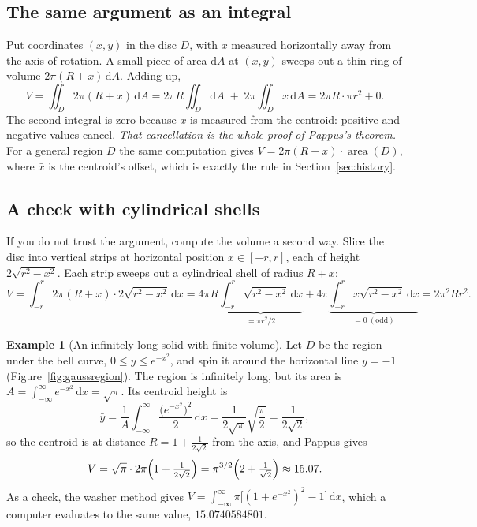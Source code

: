 \documentclass[11pt]{article}
\theoremstyle{plain}
\theoremstyle{definition}
\newtheorem{example}[lemma]{Example}
\theoremstyle{remark}
\newcommand{\dd}{\,\mathrm{d}}
\begin{document}
\subsection{The same argument as an integral}
Put coordinates $(x,y)$ in the disc $D$, with $x$ measured horizontally away from the axis of rotation. A small piece of area $\mathrm dA$ at $(x,y)$ sweeps out a thin ring of volume $2\pi(R+x)\,\mathrm dA$. Adding up,
\[
  V = \iint_D 2\pi(R+x)\dd A
    = 2\pi R\iint_D \mathrm dA \;+\; 2\pi\iint_D x\dd A
    = 2\pi R\cdot \pi r^2 + 0 .
\]
The second integral is zero because $x$ is measured from the centroid: positive and negative values cancel. \emph{That cancellation is the whole proof of Pappus's theorem.} For a general region $D$ the same computation gives $V=2\pi(R+\bar x)\cdot\operatorname{area}(D)$, where $\bar x$ is the centroid's offset, which is exactly the rule in Section~\ref{sec:history}.

\subsection{A check with cylindrical shells}
If you do not trust the argument, compute the volume a second way. Slice the disc into vertical strips at horizontal position $x\in[-r,r]$, each of height $2\sqrt{r^2-x^2}$. Each strip sweeps out a cylindrical shell of radius $R+x$:
\[
  V=\int_{-r}^{r}2\pi(R+x)\cdot 2\sqrt{r^2-x^2}\dd x
   = 4\pi R\underbrace{\int_{-r}^{r}\sqrt{r^2-x^2}\dd x}_{=\pi r^2/2}
   + 4\pi\underbrace{\int_{-r}^{r}x\sqrt{r^2-x^2}\dd x}_{=0\ (\text{odd})}
   = 2\pi^2Rr^2 .
\]

\begin{example}[An infinitely long solid with finite volume]\label{ex:gauss}
Let $D$ be the region under the bell curve, $0\le y\le e^{-x^2}$, and spin it around the horizontal line $y=-1$ (Figure~\ref{fig:gaussregion}). The region is infinitely long, but its area is $A=\int_{-\infty}^{\infty}e^{-x^2}\dd x=\sqrt\pi$. Its centroid height is
\[
  \bar y=\frac1A\int_{-\infty}^{\infty}\frac{\bigl(e^{-x^2}\bigr)^2}{2}\dd x=\frac{1}{2\sqrt\pi}\sqrt{\frac\pi2}=\frac{1}{2\sqrt2},
\]
so the centroid is at distance $R=1+\frac1{2\sqrt2}$ from the axis, and Pappus gives
\[
  V=\sqrt\pi\cdot 2\pi\Bigl(1+\tfrac1{2\sqrt2}\Bigr)=\pi^{3/2}\Bigl(2+\tfrac1{\sqrt2}\Bigr)\approx 15.07 .
\]
As a check, the washer method gives $V=\int_{-\infty}^{\infty}\pi\bigl[(1+e^{-x^2})^2-1\bigr]\dd x$, which a computer evaluates to the same value, $15.0740584801$.
\end{example}
\end{document}
